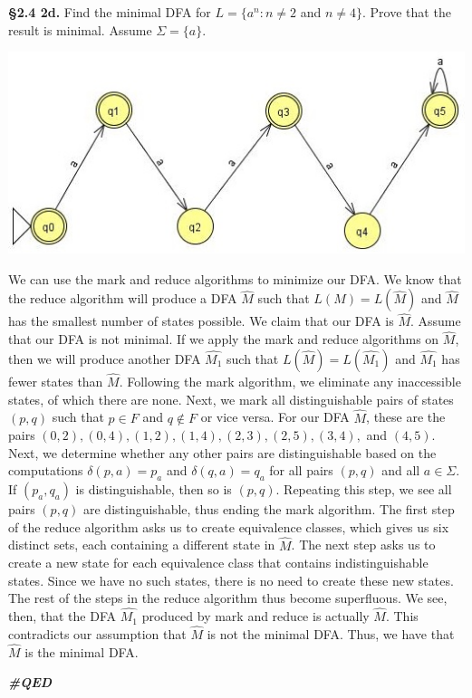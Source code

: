 \documentclass[12pt,letter]{article}
\newcommand{\QED}{
	\begin{flushright}
		\textit{\textbf{\#QED}}
	\end{flushright}
}
\begin{document}
\pagebreak


\textbf{\S 2.4 2d.} Find the minimal DFA for $L = \lbrace a^n : n \neq 2$ and $n \neq 4 \rbrace$. Prove that the result is minimal. Assume $\Sigma = \lbrace a \rbrace$.

\begin{center}
	\includegraphics{"images/Lab 2 - 2d"}
\end{center}

We can use the mark and reduce algorithms to minimize our DFA. We know that the reduce algorithm will produce a DFA $\widehat{M}$ such that $L(M) = L(\widehat{M})$ and $\widehat{M}$ has the smallest number of states possible. We claim that our DFA is $\widehat{M}$. Assume that our DFA is not minimal. If we apply the mark and reduce algorithms on $\widehat{M}$, then we will produce another DFA $\widehat{M_1}$ such that $L(\widehat{M}) = L(\widehat{M_1})$ and $\widehat{M_1}$ has fewer states than $\widehat{M}$. Following the mark algorithm, we eliminate any inaccessible states, of which there are none. Next, we mark all distinguishable pairs of states $(p, q)$ such that $p \in F$ and $q \not \in F$ or vice versa. For our DFA $\widehat{M}$, these are the pairs $(0, 2), (0, 4), (1, 2), (1, 4), (2, 3), (2, 5), (3, 4),$ and $(4, 5)$. Next, we determine whether any other pairs are distinguishable based on the computations $\delta (p, a) = p_a$ and $\delta (q, a) = q_a$ for all pairs $(p, q)$ and all $a \in \Sigma$. If $(p_a, q_a)$ is distinguishable, then so is $(p, q)$. Repeating this step, we see all pairs $(p, q)$ are distinguishable, thus ending the mark algorithm. The first step of the reduce algorithm asks us to create equivalence classes, which gives us six distinct sets, each containing a different state in $\widehat{M}$. The next step asks us to create a new state for each equivalence class that contains indistinguishable states. Since we have no such states, there is no need to create these new states. The rest of the steps in the reduce algorithm thus become superfluous. We see, then, that the DFA $\widehat{M_1}$ produced by mark and reduce is actually $\widehat{M}$. This contradicts our assumption that $\widehat{M}$ is not the minimal DFA. Thus, we have  that $\widehat{M}$ is the minimal DFA. \QED
\end{document}
